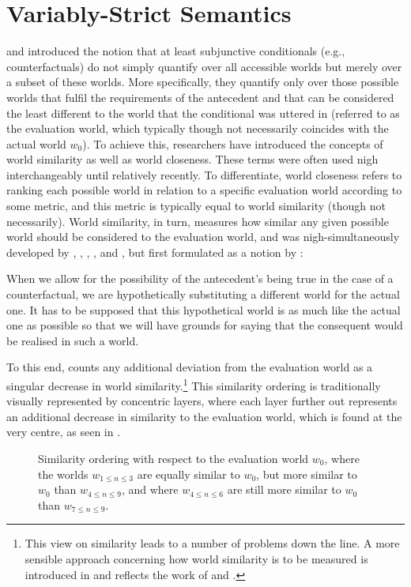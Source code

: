 \section{Variably-Strict Semantics}
\textcite{Stalnaker1968} and \textcite{Lewis1973} introduced the notion that at least subjunctive conditionals (e.g., counterfactuals) do not simply quantify over all accessible worlds but merely over a subset of these worlds. More specifically, they quantify only over those possible worlds that fulfil the requirements of the antecedent and that can be considered the least different to the world that the conditional was uttered in (referred to as the evaluation world, which typically though not necessarily coincides with the actual world $w_0$). To achieve this, researchers have introduced the concepts of world similarity as well as world closeness. These terms were often used nigh interchangeably until relatively recently. To differentiate, world closeness refers to ranking each possible world in relation to a specific evaluation world according to some metric, and this metric is typically equal to world similarity (though not necessarily). World similarity, in turn, measures how similar any given possible world should be considered to the evaluation world, and was nigh-simultaneously developed by \textcite{Stalnaker1968}, \textcite{Stalnaker1970}, \textcite{Sprigge1970}, \textcite{Lewis1973}, and \textcite{Nute1975}, but first formulated as a notion by \textcite[p.~107]{Todd1964}:
\begin{displayquote}
When we allow for the possibility of the antecedent’s being true in the case of a counterfactual, we are hypothetically substituting a different world for the actual one. It has to be supposed that this hypothetical world is as much like the actual one as possible so that we will have grounds for saying that the consequent would be realised in such a world.
\end{displayquote}
To this end, \textcite{Lewis1973} counts any additional deviation from the evaluation world as a singular decrease in world similarity.\footnote{This view on similarity leads to a number of problems down the line. A more sensible approach concerning how world similarity is to be measured is introduced in  and reflects the work of \textcite{Bennett2003} and \textcite{Arregui2009}.} This similarity ordering is traditionally visually represented by concentric layers, where each layer further out represents an additional decrease in similarity to the evaluation world, which is found at the very centre, as seen in .
\begin{figure}[!htb]

\caption{Similarity ordering with respect to the evaluation world $w_0$, where the worlds $w_{1\leqslant n\leqslant3}$ are equally similar to $w_0$, but more similar to $w_0$ than $w_{4\leqslant n\leqslant9}$, and where $w_{4\leqslant n\leqslant6}$ are still more similar to $w_0$ than $w_{7\leqslant n\leqslant9}$.}
\end{figure}

